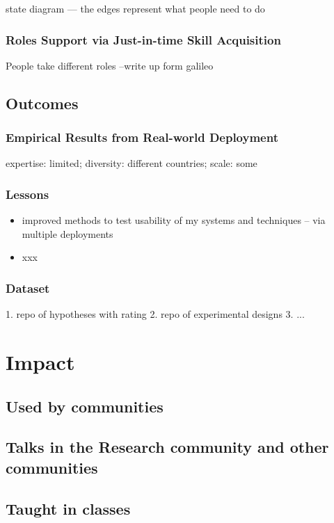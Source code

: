 state diagram — the edges represent what people need to do 

\subsubsection{Roles Support via Just-in-time Skill Acquisition}
 People take different roles
--write up form galileo


\subsection{Outcomes}
\subsubsection{Empirical Results from Real-world Deployment}
expertise: limited; diversity: different countries; scale: some

\subsubsection{Lessons}
\begin{itemize}
\item improved methods to test usability of my systems and techniques -- via multiple deployments
\item xxx
\end{itemize}

\subsubsection{Dataset}
1. repo of hypotheses with rating
2. repo of experimental designs
3. ...

\section{Impact}
 \subsection{Used by communities}
 \subsection{Talks in the Research community and other communities}
 \subsection{Taught in classes}


